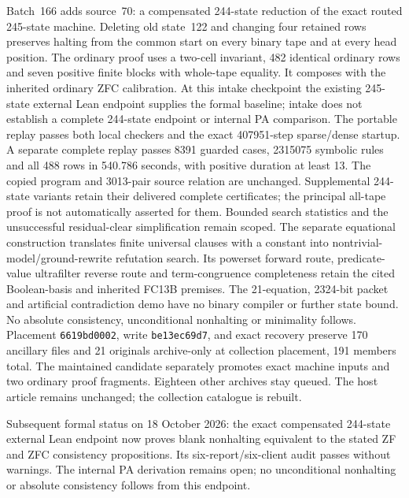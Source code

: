 \documentclass[11pt]{article}
\begin{document}
{Batch~166 adds source~70: a compensated 244-state reduction of the exact
routed 245-state machine. Deleting old state~122 and changing four retained
rows preserves halting from the common start on every binary tape and at every
head position. The ordinary proof uses a two-cell invariant, 482 identical
ordinary rows and seven positive finite blocks with whole-tape equality. It
composes with the inherited ordinary ZFC calibration. At this intake checkpoint
the existing 245-state external Lean endpoint supplies the formal baseline;
intake does not establish a complete 244-state endpoint or internal PA comparison.
The portable replay passes both local checkers and the exact 407951-step
sparse/dense startup. A separate complete replay passes 8391 guarded cases,
2315075 symbolic rules and all 488 rows in 540.786 seconds, with positive
duration at least 13. The copied program and 3013-pair source relation are
unchanged. Supplemental 244-state variants retain their delivered complete
certificates; the principal all-tape proof is not automatically asserted for
them. Bounded search statistics and the unsuccessful residual-clear
simplification remain scoped.
The separate equational construction translates finite universal clauses with
a constant into nontrivial-model/ground-rewrite refutation search. Its powerset
forward route, predicate-value ultrafilter reverse route and term-congruence
completeness retain the cited Boolean-basis and inherited FC13B premises.
The 21-equation, 2324-bit packet and artificial contradiction demo have no binary
compiler or further state bound. No absolute consistency, unconditional
nonhalting or minimality follows.
Placement \texttt{6619bd0002}, write \texttt{be13ec69d7}, and exact recovery
preserve 170 ancillary files and 21 originals archive-only at collection
placement, 191 members total. The maintained candidate separately promotes
exact machine inputs and two ordinary proof fragments. Eighteen other archives
stay queued. The host article remains unchanged; the collection catalogue is
rebuilt.

Subsequent formal status on 18 October 2026: the exact compensated 244-state
external Lean endpoint now proves blank nonhalting equivalent to the stated
ZF and ZFC consistency propositions. Its six-report/six-client audit passes
without warnings. The internal PA derivation remains open; no unconditional
nonhalting or absolute consistency follows from this endpoint.


}
\end{document}
